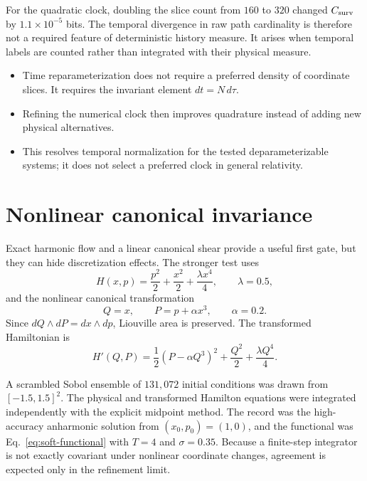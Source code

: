\documentclass[10pt]{article}
\newenvironment{persuasions}
  {\begin{cpbox}\small\setlength{\parskip}{0pt}%
   {\footnotesize\bfseries\color{accent}%
    \textls[110]{CONCEPTUAL PERSUASIONS}}\par\vspace{3pt}%
   \begin{itemize}[leftmargin=1.15em,itemsep=2.5pt,topsep=0pt,parsep=0pt,
                   label=\textcolor{accent}{\scriptsize$\blacktriangleright$}]}
  {\end{itemize}\end{cpbox}}
\begin{document}
For the quadratic clock, doubling the slice count from $160$ to $320$ changed
$C_{\rm surv}$ by $1.1\times10^{-5}$ bits.  The temporal divergence in raw
path cardinality is therefore not a required feature of deterministic history
measure.  It arises when temporal labels are counted rather than integrated
with their physical measure.

\begin{persuasions}
\item Time reparameterization does not require a preferred density of
coordinate slices.  It requires the invariant element $dt=N\,d\tau$.
\item Refining the numerical clock then improves quadrature instead of adding
new physical alternatives.
\item This resolves temporal normalization for the tested deparameterizable
systems; it does not select a preferred clock in general relativity.
\end{persuasions}

\section*{Nonlinear canonical invariance}

Exact harmonic flow and a linear canonical shear provide a useful first gate,
but they can hide discretization effects.  The stronger test uses
\begin{equation}
H(x,p)=\frac{p^2}{2}+\frac{x^2}{2}+\frac{\lambda x^4}{4},
\qquad \lambda=0.5,
\label{eq:anharmonic-hamiltonian}
\end{equation}
and the nonlinear canonical transformation
\begin{equation}
Q=x,
\qquad P=p+\alpha x^3,
\qquad \alpha=0.2.
\label{eq:nonlinear-shear}
\end{equation}
Since $dQ\wedge dP=dx\wedge dp$, Liouville area is preserved.  The transformed
Hamiltonian is
\begin{equation}
H'(Q,P)=\frac12(P-\alpha Q^3)^2
+\frac{Q^2}{2}+\frac{\lambda Q^4}{4}.
\label{eq:transformed-hamiltonian}
\end{equation}

A scrambled Sobol ensemble of $131{,}072$ initial conditions was drawn from
$[-1.5,1.5]^2$.  The physical and transformed Hamilton equations were
integrated independently with the explicit midpoint method.  The record was
the high-accuracy anharmonic solution from $(x_0,p_0)=(1,0)$, and the
functional was Eq.~\eqref{eq:soft-functional} with $T=4$ and $\sigma=0.35$.
Because a finite-step integrator is not exactly covariant under nonlinear
coordinate changes, agreement is expected only in the refinement limit.
\end{document}
